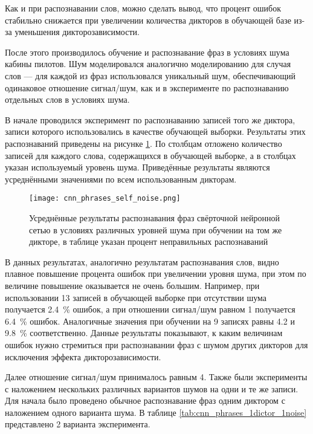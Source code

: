 Как и при распознавании слов, можно сделать вывод, что процент ошибок стабильно снижается при увеличении количества дикторов в обучающей базе из-за уменьшения дикторозависимости.

После этого производилось обучение и распознавание фраз в условиях шума кабины пилотов.
Шум моделировался аналогично моделированию для случая слов --- для каждой из фраз использовался уникальный шум, обеспечивающий одинаковое отношение сигнал/шум, как и в эксперименте по распознаванию отдельных слов в условиях шума.

В начале проводился эксперимент по распознаванию записей того же диктора, записи которого использовались в качестве обучающей выборки.
Результаты этих распознаваний приведены на рисунке \ref{fig:cnn_phrases_self_noise}.
По столбцам отложено количество записей для каждого слова, содержащихся в обучающей выборке, а в столбцах указан используемый уровень шума.
Приведённые результаты являются усреднёнными значениями по всем использованным дикторам.

\begin{figure}[h]
	\centering
	\texttt{[image: cnn\_phrases\_self\_noise.png]}
	\caption{Усреднённые результаты распознавания фраз свёрточной нейронной сетью в условиях различных уровней шума при обучении на том же дикторе, в таблице указан процент неправильных распознаваний}
	\label{fig:cnn_phrases_self_noise}
\end{figure}

В данных результатах, аналогично результатам распознавания слов, видно плавное повышение процента ошибок при увеличении уровня шума, при этом по величине повышение оказывается не очень большим.
Например, при использовании 13 записей в обучающей выборке при отсутствии шума получается 2.4~\% ошибок, а при отношении сигнал/шум равном 1 получается 6.4~\% ошибок.
Аналогичные значения при обучении на 9 записях равны 4.2 и 9.8~\% соответственно.
Данные результаты показывают, к каким величинам ошибок нужно стремиться при распознавании фраз с шумом других дикторов для исключения эффекта дикторозависимости.

Далее отношение сигнал/шум принималось равным 4.
Также были эксперименты с наложением нескольких различных вариантов шумов на одни и те же записи.
Для начала было проведено обычное распознавание фраз одним диктором с наложением одного варианта шума.
В таблице \ref{tab:cnn_phrases_1dictor_1noise} представлено 2 варианта эксперимента.

